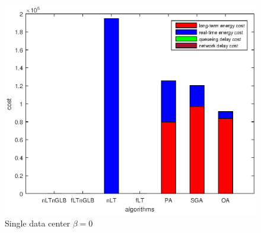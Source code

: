 \begin{figure}
	\centering
	\includegraphics[width=0.9\linewidth]{figs/cost_comparison_single_dc_beta_zero}
	\caption{Single data center $\beta=0$}
	\label{fig:singleDC}
\end{figure}


